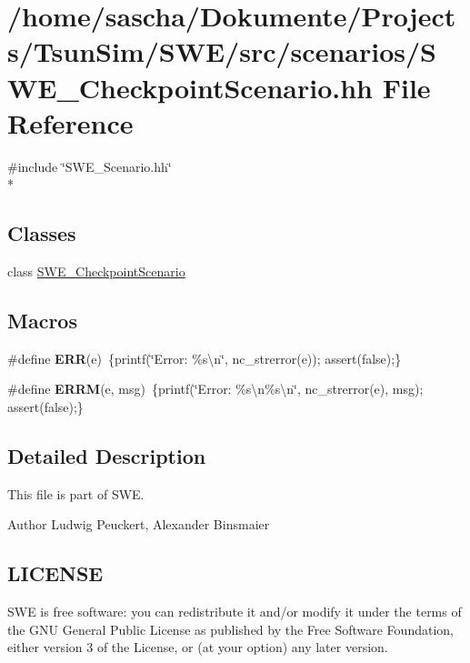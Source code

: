 \hypertarget{SWE__CheckpointScenario_8hh}{\section{/home/sascha/\-Dokumente/\-Projects/\-Tsun\-Sim/\-S\-W\-E/src/scenarios/\-S\-W\-E\-\_\-\-Checkpoint\-Scenario.hh File Reference}
\label{SWE__CheckpointScenario_8hh}
}
{\ttfamily \#include \char`\"{}S\-W\-E\-\_\-\-Scenario.\-hh\char`\"{}}\\*
\subsection*{Classes}
\begin{DoxyCompactItemize}
\item 
class \hyperlink{classSWE__CheckpointScenario}{S\-W\-E\-\_\-\-Checkpoint\-Scenario}
\end{DoxyCompactItemize}
\subsection*{Macros}
\begin{DoxyCompactItemize}
\item 
\hypertarget{SWE__CheckpointScenario_8hh_a588357de2986fdf4c1380190f7ae9f37}{\#define {\bfseries E\-R\-R}(e)~\{printf(\char`\"{}Error\-: \%s\textbackslash{}n\char`\"{}, nc\-\_\-strerror(e)); assert(false);\}}\label{SWE__CheckpointScenario_8hh_a588357de2986fdf4c1380190f7ae9f37}

\item 
\hypertarget{SWE__CheckpointScenario_8hh_a742b6995c6388de5a6880ed2f9eab9dc}{\#define {\bfseries E\-R\-R\-M}(e, msg)~\{printf(\char`\"{}Error\-: \%s\textbackslash{}n\%s\textbackslash{}n\char`\"{}, nc\-\_\-strerror(e), msg); assert(false);\}}\label{SWE__CheckpointScenario_8hh_a742b6995c6388de5a6880ed2f9eab9dc}

\end{DoxyCompactItemize}


\subsection{Detailed Description}
This file is part of S\-W\-E.

\begin{DoxyAuthor}{Author}
Ludwig Peuckert, Alexander Binsmaier
\end{DoxyAuthor}
\hypertarget{Writer_8hh_LICENSE}{}\subsection{L\-I\-C\-E\-N\-S\-E}\label{Writer_8hh_LICENSE}
S\-W\-E is free software\-: you can redistribute it and/or modify it under the terms of the G\-N\-U General Public License as published by the Free Software Foundation, either version 3 of the License, or (at your option) any later version.

